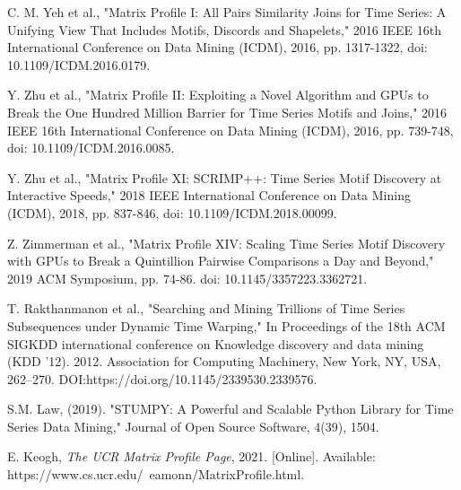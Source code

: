 \documentclass[conference]{IEEEtran}
\begin{document}





\begin{thebibliography}{7}  

 C. M. Yeh et al., "Matrix Profile I: All Pairs Similarity Joins for Time Series: A Unifying View That Includes Motifs, Discords and Shapelets," 2016 IEEE 16th International Conference on Data Mining (ICDM), 2016, pp. 1317-1322, doi: 10.1109/ICDM.2016.0179.

 Y. Zhu et al., "Matrix Profile II: Exploiting a Novel Algorithm and GPUs to Break the One Hundred Million Barrier for Time Series Motifs and Joins," 2016 IEEE 16th International Conference on Data Mining (ICDM), 2016, pp. 739-748, doi: 10.1109/ICDM.2016.0085.

 Y. Zhu et al., "Matrix Profile XI: SCRIMP++: Time Series Motif Discovery at Interactive Speeds," 2018 IEEE International Conference on Data Mining (ICDM), 2018, pp. 837-846, doi: 10.1109/ICDM.2018.00099.

 Z. Zimmerman et al., "Matrix Profile XIV: Scaling Time Series Motif Discovery with GPUs to Break a Quintillion Pairwise Comparisons a Day and Beyond," 2019 ACM Symposium, pp. 74-86. doi: 10.1145/3357223.3362721. 

 T. Rakthanmanon et al., "Searching and Mining Trillions of Time Series Subsequences under Dynamic Time Warping," In Proceedings of the 18th ACM SIGKDD international conference on Knowledge discovery and data mining (KDD '12). 2012. Association for Computing Machinery, New York, NY, USA, 262–270. DOI:https://doi.org/10.1145/2339530.2339576.

 S.M. Law, (2019). "STUMPY: A Powerful and Scalable Python Library for Time Series Data Mining," Journal of Open Source Software, 4(39), 1504.

 E. Keogh, \emph{The UCR Matrix Profile Page}, 2021. [Online]. Available: https://www.cs.ucr.edu/~eamonn/MatrixProfile.html.


\end{thebibliography}
\end{document}

